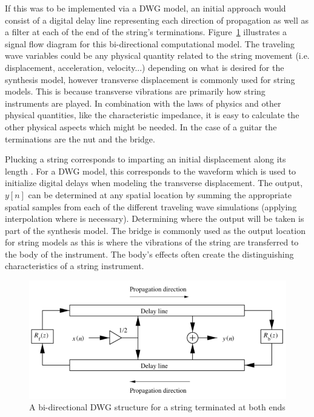 \documentclass[main.tex]{subfiles}
\begin{document}
If this was to be implemented via a DWG model, an initial approach would consist of a digital delay line representing each direction of propagation as well as a filter at each of the end of the string's terminations. Figure~\ref{fig:BiDirectionDWG} illustrates a signal flow diagram for this bi-directional computational model. The traveling wave variables could be any physical quantity related to the string movement (i.e. displacement, acceleration, velocity...) depending on what is desired for the synthesis model, however transverse displacement is commonly used for string models. This is because transverse vibrations are primarily how string instruments are played. In combination with the laws of physics and other physical quantities, like the characteristic impedance, it is easy to calculate the other physical aspects which might be needed. In the case of a guitar the terminations are the nut and the bridge.

Plucking a string corresponds to imparting an initial displacement along its length . For a DWG model, this corresponds to the waveform which is used to initialize digital delays when modeling the transverse displacement. The output, $y[n]$ can be determined at any spatial location by summing the appropriate spatial samples from each of the different traveling wave simulations (applying interpolation where is necessary). Determining where the output will be taken is part of the synthesis model. The bridge is commonly used as the output location for string models as this is where the vibrations of the string are transferred to the body of the instrument. The body's effects often create the distinguishing characteristics of a string instrument.

\begin{figure}[h]
    \centering
    \includegraphics[scale=.85]{./images/diagrams/BiDirectionalDWG1.png}
    \caption{A bi-directional DWG structure for a string terminated at both ends }
    \label{fig:BiDirectionDWG}
\end{figure}
\end{document}
